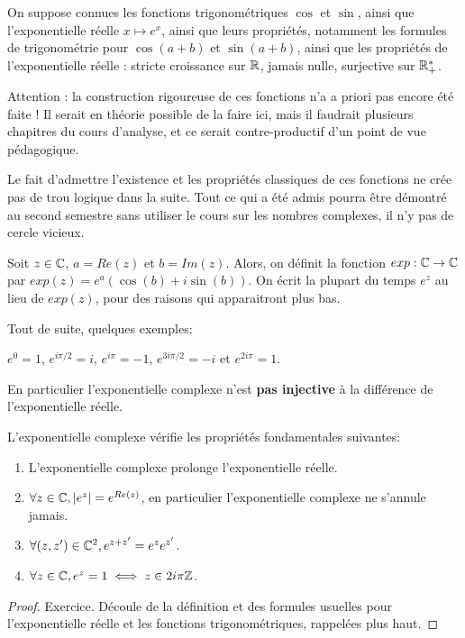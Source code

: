 On suppose connues les fonctions trigonométriques $\cos$ et $\sin$, ainsi que l'exponentielle réelle $x\mapsto e^x$, ainsi que leurs propriétés, notamment les formules de trigonométrie pour $\cos(a+b)$ et $\sin(a+b)$, ainsi que les propriétés de l'exponentielle réelle : stricte croissance sur $\mathbb{R}$, jamais nulle, surjective sur $\mathbb{R}_+^*$.

\begin{mdframed}
Attention : la construction rigoureuse de ces fonctions n'a a priori pas encore été faite ! Il serait en théorie possible de la faire ici, mais il faudrait plusieurs chapitres du cours d'analyse, et ce serait contre-productif d'un point de vue pédagogique.

Le fait d'admettre l'existence et les propriétés classiques de ces fonctions ne crée pas de trou logique dans la suite. Tout ce qui a été admis pourra être démontré au second semestre sans utiliser le cours sur les nombres complexes, il n'y pas de cercle vicieux.
\end{mdframed}

\begin{definition}
Soit $z \in \mathbb{C}$, $a = Re(z)$ et $b = Im(z)$. Alors, on définit la fonction $exp : \mathbb{C}\to \mathbb{C}$ par $exp(z) = e^a (\cos(b)+i \sin(b))$. On écrit la plupart du temps $e^z$ au lieu de $exp(z)$, pour des raisons qui apparaitront plus bas.
\end{definition}

Tout de suite, quelques exemples:

\begin{exemples}
$e^0=1$, $e^{i\pi/2} = i$, $e^{i\pi}=-1$, $e^{3i\pi/2}=-i$ et $e^{2i\pi}=1$. 
\end{exemples}

\begin{mdframed}
En particulier l'exponentielle complexe n'est \textbf{pas injective} à la différence de l'exponentielle réelle.
\end{mdframed}

\begin{proposition}
L'exponentielle complexe vérifie les propriétés fondamentales suivantes:
\begin{enumerate}
\item L'exponentielle complexe prolonge l'exponentielle réelle.
\item $\forall z\in\mathbb{C}, |e^z| = e^{Re(z)}$, en particulier l'exponentielle complexe ne s'annule jamais.
\item $\forall (z,z')\in\mathbb{C}^2, e^{z+z'} = e^ze^{z'}$.
\item $\forall z\in\mathbb{C}, e^z=1 \iff z \in 2i\pi\mathbb{Z}$.
\end{enumerate}
\end{proposition}
\begin{proof}
Exercice. Découle de la définition et des formules usuelles pour l'exponentielle réelle et les fonctions trigonométriques, rappelées plus haut.
\end{proof}


